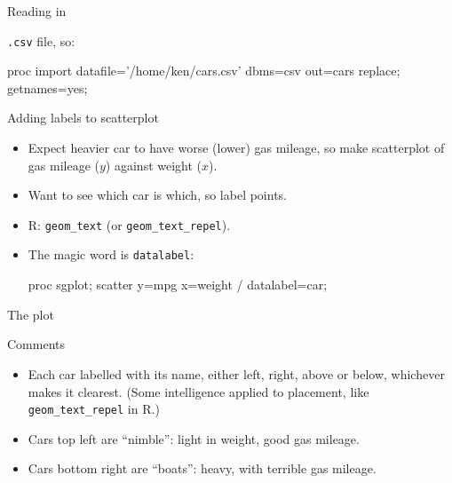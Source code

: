 \documentclass[unknownkeysallowed]{beamer}\usepackage[]{graphicx}\usepackage[]{color}
\begin{document}
\begin{frame}[fragile]{Reading in}
  
  \texttt{.csv} file, so:
  
    \begin{Datastep}
proc import 
  datafile='/home/ken/cars.csv'
  dbms=csv
  out=cars
  replace;
  getnames=yes;
    \end{Datastep}
  
  
\end{frame}

\begin{frame}[fragile]{Adding labels to scatterplot}
  
  \begin{itemize}
  \item Expect heavier car to have worse (lower) gas mileage, so make
    scatterplot of gas mileage ($y$) against weight ($x$).
  \item Want to see which car is which, so label points. 
    
  \item R: \texttt{geom\_text} (or \texttt{geom\_text\_repel}).
  \item The magic word is \texttt{datalabel}:
    
    \begin{Sascode}[store=muggins]
proc sgplot;
  scatter y=mpg x=weight / datalabel=car;
    \end{Sascode}
  \end{itemize}
  
\end{frame}


\begin{frame}[fragile]{The plot}
  
  
\end{frame}

\begin{frame}[fragile]{Comments}
  
  \begin{itemize}
  \item Each car labelled with its name, either left, right, above or
    below, whichever makes it clearest. (Some intelligence applied to
    placement, like \texttt{geom\_text\_repel} in R.)
  \item Cars top left are ``nimble'': light in weight, good gas
    mileage.
  \item Cars bottom right are ``boats'': heavy, with terrible gas mileage.
  \end{itemize}
  
\end{frame}
\end{document}
